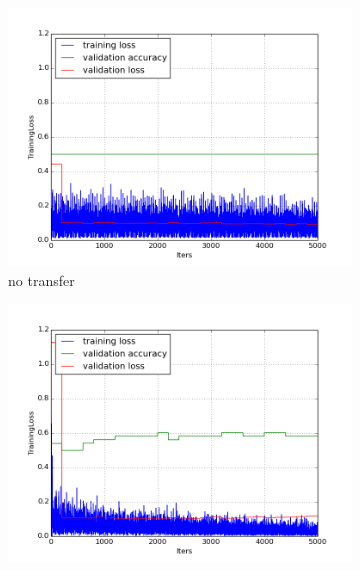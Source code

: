 \documentclass[a4paper,11pt]{article}
\begin{document}
\begin{figure}
    \centering
    \begin{minipage}[b]{\textwidth}
      \begin{subfigure}{.5\textwidth} 
        \centering
        \includegraphics[scale=0.4]{images/plot_clampdetCI98_tl_wout.png}
        \caption{no transfer}\label{fig:2a}
      \end{subfigure}%
      \begin{subfigure}{.5\textwidth} 
        \centering
        \includegraphics[scale=0.4]{images/plot_clampdetCI98_none_reinit_bs128_lr4.png}

\end{subfigure}
\end{minipage}
\end{figure}
\end{document}

